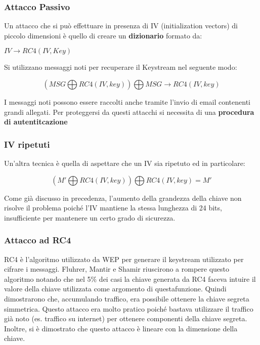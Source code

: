 \documentclass{article}
\theoremstyle{remark}
\begin{document}
\subsubsection{Attacco Passivo}
Un attacco che si può effettuare in presenza di IV (initialization vectors) di piccolo dimensioni è quello di creare un \textbf{dizionario} formato da:
\begin{center}
	$IV\rightarrow RC4(IV,Key)$
\end{center}
Si utilizzano messaggi noti per recuperare il Keystream nel seguente modo:
\begin{center}
	\begin{equation}
		(MSG\bigoplus RC4(IV,key))\bigoplus MSG\rightarrow RC4(IV,key)
	\end{equation}
\end{center}
I messaggi noti possono essere raccolti anche tramite l'invio di email contenenti grandi allegati. Per proteggersi da questi attacchi si necessita di una \textbf{procedura di autentitcazione}
\subsubsection{IV ripetuti}
Un'altra tecnica è quella di aspettare che un IV sia ripetuto ed in particolare:
\begin{center}
	\begin{equation}
		(M'\bigoplus RC4(IV,key))\bigoplus RC4(IV,key)=M'
	\end{equation}
\end{center}
Come già discusso in precedenza, l'aumento della grandezza della chiave non risolve il problema poiché l'IV mantiene la stessa lunghezza di 24 bits, insufficiente per mantenere un certo grado di sicurezza.
\subsubsection{Attacco ad RC4}
RC4 è l'algoritmo utilizzato da WEP per generare il keystream utilizzato per cifrare i messaggi. Fluhrer, Mantir e Shamir riuscirono a rompere questo algoritmo notando che nel 5\% dei casi la chiave generata da RC4 faceva intuire il valore della chiave utilizzata come argomento di questafunzione. Quindi dimostrarono che, accumulando traffico, era possibile ottenere la chiave segreta simmetrica.
Questo attacco era molto pratico poiché bastava utilizzare il traffico già noto (es. traffico su internet) per ottenere componenti della chiave segreta. Inoltre, si è dimostrato che questo attacco è lineare con la dimensione della chiave.
\end{document}
